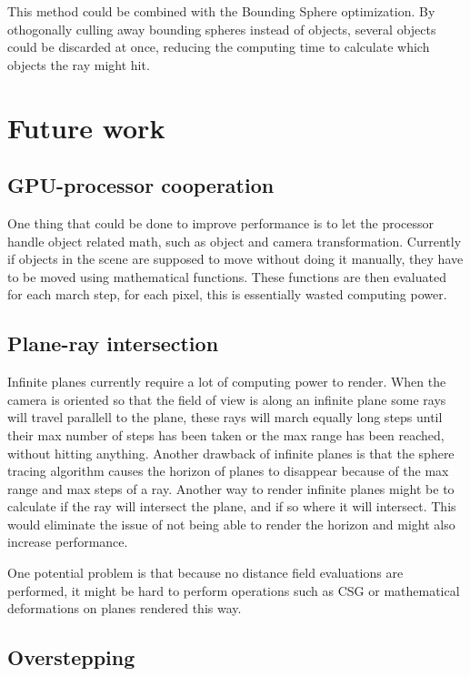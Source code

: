 			This method could be combined with the Bounding Sphere optimization.
			By othogonally culling away bounding spheres instead of objects, 
			several objects could be discarded at once, reducing the computing
			time to calculate which objects the ray might hit.

	\section{Future work}

		\subsection{GPU-processor cooperation}
		
			One thing that could be done to improve performance is to let the
			processor handle object related math, such as object and camera 
			transformation. Currently if objects in the scene are supposed to 
			move without doing it manually, they have to be moved using 
			mathematical functions. These functions are then evaluated for 
			each march step, for each pixel, this is essentially wasted 
			computing power.


		\subsection{Plane-ray intersection}

			Infinite planes currently require a lot of computing power to render. When
			the camera is oriented so that the field of view is along an infinite
			plane some rays will travel parallell to the plane, these rays will march 
			equally long steps until their max number of steps has been taken or
			the max range has been reached, without hitting anything. Another
			drawback of infinite planes is that the sphere tracing algorithm causes
			the horizon of planes to disappear because of the max range and max 
			steps of a ray. Another way to render infinite planes might be to 
			calculate if the ray will intersect the plane, and if so where it 
			will intersect. This would eliminate the issue of not being able 
			to render the horizon and might also increase performance.

			One potential problem is that because no distance field evaluations 
			are performed, it might be hard to perform operations such as CSG or
			mathematical deformations on planes rendered this way.

		\subsection{Overstepping}

